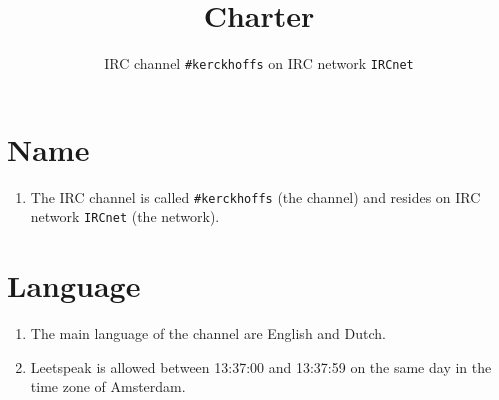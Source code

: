 \documentclass[a4paper,10pt]{scrartcl}
\title{Charter}
\subtitle{IRC channel \texttt{\#kerckhoffs} on IRC network \texttt{IRCnet}}
\author{}
\date{}
\begin{document}
\maketitle

\section{Name}
\begin{enumerate}
	\item The IRC channel is called \texttt{\#kerckhoffs} (the channel) and resides on IRC network \texttt{IRCnet} (the network).
\end{enumerate}

\section{Language}
\begin{enumerate}
	\item The main language of the channel are English and Dutch.
	\item Leetspeak is allowed between 13:37:00 and 13:37:59 on the same day in the time zone of Amsterdam.
\end{enumerate}
\end{document}
